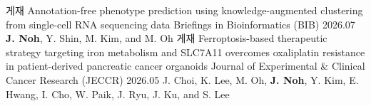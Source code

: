 \documentclass[11pt, a4paper]{awesome-cv}
\let\origcvsection\cvsection
\renewcommand{\cvsection}[1]{\needspace{7\baselineskip}\origcvsection{#1}}
\let\origcvsubsection\cvsubsection
\renewcommand{\cvsubsection}[1]{\needspace{5\baselineskip}\origcvsubsection{#1}}
\begin{document}
\vspace{-3.5mm}



\begin{cventries}
\cventry
    {게재}
    {Annotation-free phenotype prediction using knowledge-augmented clustering \newline from single-cell RNA sequencing data}
    {Briefings in Bioinformatics (BIB)}
    {2026.07}
    {
      \textbf{J. Noh}, Y. Shin, M. Kim, and M. Oh
    }
\vspace{3.5mm}
\cventry
    {게재}
    {Ferroptosis-based therapeutic strategy targeting iron metabolism and SLC7A11 overcomes oxaliplatin resistance in patient-derived pancreatic cancer organoids}
    {Journal of Experimental \& Clinical Cancer Research (JECCR)}
    {2026.05}
    {
      J. Choi, K. Lee, M. Oh, \textbf{J. Noh}, Y. Kim, E. Hwang,
      I. Cho, W. Paik, J. Ryu, J. Ku, and S. Lee
    }
\end{cventries}

\end{document}
